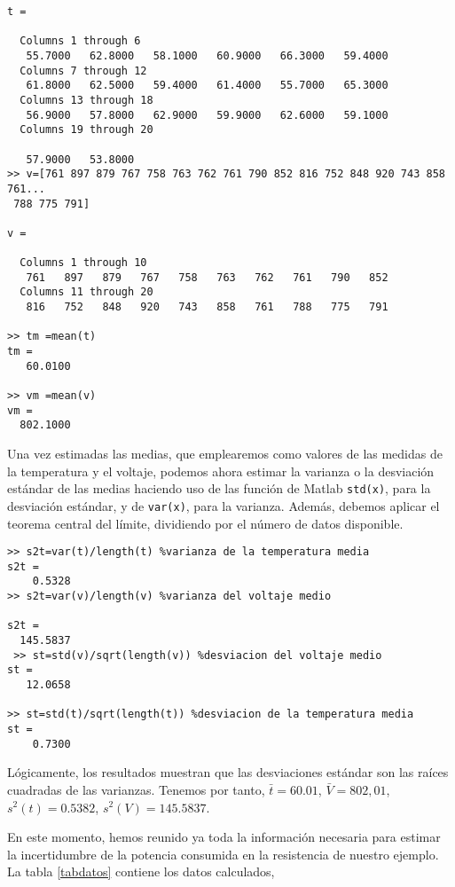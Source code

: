 \begin{itemize}
\begin{verbatim}
t =

  Columns 1 through 6
   55.7000   62.8000   58.1000   60.9000   66.3000   59.4000
  Columns 7 through 12
   61.8000   62.5000   59.4000   61.4000   55.7000   65.3000
  Columns 13 through 18
   56.9000   57.8000   62.9000   59.9000   62.6000   59.1000
  Columns 19 through 20

   57.9000   53.8000
>> v=[761 897 879 767 758 763 762 761 790 852 816 752 848 920 743 858 761...
 788 775 791]

v =

  Columns 1 through 10
   761   897   879   767   758   763   762   761   790   852
  Columns 11 through 20
   816   752   848   920   743   858   761   788   775   791

>> tm =mean(t)
tm =
   60.0100

>> vm =mean(v)
vm =
  802.1000
\end{verbatim}

Una vez estimadas las medias, que emplearemos como valores de las medidas de la temperatura y el voltaje,  podemos ahora estimar la varianza o la desviación estándar de las medias haciendo uso de las función de Matlab \texttt{std(x)}, para la desviación estándar,  y de \texttt{var(x)}, para la varianza.  Además, debemos aplicar el teorema central del límite, dividiendo por el número de datos disponible.

\begin{verbatim}
>> s2t=var(t)/length(t) %varianza de la temperatura media
s2t =
    0.5328
>> s2t=var(v)/length(v) %varianza del voltaje medio

s2t =
  145.5837
 >> st=std(v)/sqrt(length(v)) %desviacion del voltaje medio
st =
   12.0658

>> st=std(t)/sqrt(length(t)) %desviacion de la temperatura media
st =
    0.7300
\end{verbatim} 

Lógicamente, los resultados muestran que las desviaciones estándar son las raíces cuadradas de las varianzas. Tenemos por tanto, $\bar{t}=60.01$, $\bar{V}=802,01$, $s^2(t)=0.5382$, $s^2(V)=145.5837$.

\end{itemize} 

En este momento, hemos reunido ya toda la información necesaria para estimar la incertidumbre de la potencia consumida en la resistencia de nuestro ejemplo. La tabla \ref{tabdatos} contiene los datos calculados,


